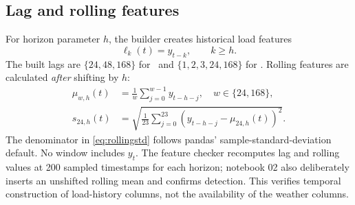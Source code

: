 \subsection{Lag and rolling features}
For horizon parameter $h$, the builder creates historical load features
\begin{equation}
\ell_k(t)=y_{t-k},\qquad k\ge h.
\label{eq:lags}
\end{equation}
The built lags are $\{24,48,168\}$ for \hday\ and $\{1,2,3,24,168\}$ for \hone. Rolling features are calculated \emph{after} shifting by $h$:
\begin{align}
\mu_{w,h}(t)&=\frac{1}{w}\sum_{j=0}^{w-1}y_{t-h-j},\quad w\in\{24,168\},\label{eq:rollingmean}\\
s_{24,h}(t)&=\sqrt{\frac{1}{23}\sum_{j=0}^{23}\left(y_{t-h-j}-\mu_{24,h}(t)\right)^2}.
\label{eq:rollingstd}
\end{align}
The denominator in \cref{eq:rollingstd} follows pandas' sample-standard-deviation default. No window includes $y_t$. The feature checker recomputes lag and rolling values at 200 sampled timestamps for each horizon; notebook 02 also deliberately inserts an unshifted rolling mean and confirms detection. This verifies temporal construction of load-history columns, not the availability of the weather columns.

